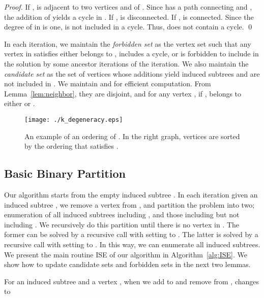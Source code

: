 \documentclass{llncs}
\newcommand{\name}[1]{\textit{#1}}
\newcommand{\MyProc}[1]{{\rm \textsc{#1}}}
\begin{document}
\begin{proof}
    If , 
     is adjacent to two vertices  and  of . 
    Since  has a path  connecting  and , 
    the addition of  yields a cycle in . 
    If ,  is disconnected. 
    If ,  is connected. 
    Since the degree of  in  is one, 
     is not included in a cycle. 
    Thus,  does not contain a cycle. 
    \qed
\end{proof}

In each iteration, 
we maintain the \name{forbidden set}  
as the vertex set such that any vertex  in  
satisfies either  belongs to , 
 includes a cycle, 
or  is forbidden to include in the solution by some ancestor iterations of the iteration.  
We also maintain the \name{candidate set}  
as the set of vertices whose additions yield induced subtrees and are not included in . 
We maintain  and  for efficient computation. 
From Lemma~\ref{lem:neighbor}, 
they are disjoint, 
and for any vertex , 
if , 
 belongs to either  or . 

\begin{figure}[!t]
    \begin{center}
        \texttt{[image: ./k\_degeneracy.eps]}
        \caption{
            An example of an ordering of . 
In the right graph, 
            vertices are sorted by the ordering that satisfies . 
\label{img:k:degeneracy}}
    \end{center}
\end{figure}


\subsection{Basic Binary Partition}
\label{subsec:algorithm}


Our algorithm starts from the empty induced subtree . 
In each iteration given an induced subtree , 
we remove a vertex  from , 
and partition the problem into two; 
enumeration of all induced subtrees including , 
and those including  but not including . 
We recursively do this partition 
until there is no vertex in . 
The former can be solved 
by a recursive call with setting  to . 
The latter is solved 
by a recursive call with setting  to . 
In this way, 
we can enumerate all induced subtrees. 
We present 
the main routine \MyProc{ISE} of our algorithm 
in Algorithm~\ref{alg:ISE}.  
We show how to update candidate sets and forbidden sets in the next two lemmas. 

\begin{lemma}
    \label{lem:can:update}
    For an induced subtree  and a vertex , 
    when we add  to  and remove  from , 
     changes to  
    
\end{lemma}
\end{document}
